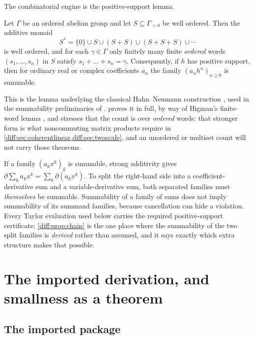\documentclass[11pt,letterpaper]{article}
\numberwithin{equation}{section}
\theoremstyle{definition}
\theoremstyle{remark}
\newcommand{\der}{\partial}
\begin{document}
The combinatorial engine is the positive-support lemma.

\begin{lemma}
\label{diff:lem:neumann}
Let $\Gamma$ be an ordered abelian group and let $S\subseteq\Gamma_{>0}$ be
well ordered. Then the additive monoid
\[
 S^{*}=\{0\}\cup S\cup(S+S)\cup(S+S+S)\cup\cdots
\]
is well ordered, and for each $\gamma\in\Gamma$ only finitely many finite
\emph{ordered} words $(s_{1},\dots,s_{n})$ in $S$ satisfy
$s_{1}+\dots+s_{n}=\gamma$. Consequently, if $h$ has positive support, then
for ordinary real or complex coefficients $a_{n}$ the family $(a_{n}h^{n})_{n\geq0}$
is summable.
\end{lemma}

This is the lemma underlying the classical Hahn--Neumann construction
\cite{Neumann}, used in the summability preliminaries of \cite{BM,BMGerms}.
 proves it in full, by way of Higman's finite-word
lemma \cite{Higman}, and stresses that the count is over \emph{ordered} words:
that stronger form is what noncommuting matrix products require in
\cref{diff:sec:coherentlinear,diff:sec:twoscale}, and an unordered or multiset
count will not carry those theorems.

\begin{warning}
\label{diff:warn:splitting}
If a family $(a_{k}x^{k})_{k}$ is summable, strong additivity gives
$\der\sum_{k}a_{k}x^{k}=\sum_{k}\der(a_{k}x^{k})$. To split the right-hand
side into a coefficient-derivative sum and a variable-derivative sum, both
separated families must \emph{themselves} be summable. Summability of a family
of sums does not imply summability of its summand families, because
cancellation can hide a violation. Every Taylor evaluation used below carries
the required positive-support certificate;
\cref{diff:prop:chain} is the one place where the summability of the two split
families is \emph{derived} rather than assumed, and it says exactly which
extra structure makes that possible.
\end{warning}

\section{The imported derivation, and smallness as a theorem}
\label{diff:sec:BM}

\subsection{The imported package}
\label{diff:sub:BMpackage}
\end{document}
